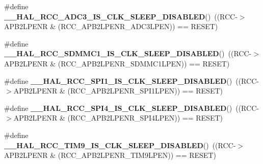 \begin{DoxyCompactItemize}
\item 
\mbox{\label{group___r_c_c___clock___sleep___enable___disable___status_ga443125428852ea38a7e59eabd07b9b6b}} 
\#define {\bfseries \+\_\+\+\_\+\+H\+A\+L\+\_\+\+R\+C\+C\+\_\+\+A\+D\+C3\+\_\+\+I\+S\+\_\+\+C\+L\+K\+\_\+\+S\+L\+E\+E\+P\+\_\+\+D\+I\+S\+A\+B\+L\+ED}()~((R\+CC-\/$>$A\+P\+B2\+L\+P\+E\+NR \& (R\+C\+C\+\_\+\+A\+P\+B2\+L\+P\+E\+N\+R\+\_\+\+A\+D\+C3\+L\+P\+EN)) == R\+E\+S\+ET)
\item 
\mbox{\label{group___r_c_c___clock___sleep___enable___disable___status_ga8b41f06ce1b40fd1e0481be7e364e6f6}} 
\#define {\bfseries \+\_\+\+\_\+\+H\+A\+L\+\_\+\+R\+C\+C\+\_\+\+S\+D\+M\+M\+C1\+\_\+\+I\+S\+\_\+\+C\+L\+K\+\_\+\+S\+L\+E\+E\+P\+\_\+\+D\+I\+S\+A\+B\+L\+ED}()~((R\+CC-\/$>$A\+P\+B2\+L\+P\+E\+NR \& (R\+C\+C\+\_\+\+A\+P\+B2\+L\+P\+E\+N\+R\+\_\+\+S\+D\+M\+M\+C1\+L\+P\+EN)) == R\+E\+S\+ET)
\item 
\mbox{\label{group___r_c_c___clock___sleep___enable___disable___status_gab9a82b96c7950398956ee6f58c3d5dda}} 
\#define {\bfseries \+\_\+\+\_\+\+H\+A\+L\+\_\+\+R\+C\+C\+\_\+\+S\+P\+I1\+\_\+\+I\+S\+\_\+\+C\+L\+K\+\_\+\+S\+L\+E\+E\+P\+\_\+\+D\+I\+S\+A\+B\+L\+ED}()~((R\+CC-\/$>$A\+P\+B2\+L\+P\+E\+NR \& (R\+C\+C\+\_\+\+A\+P\+B2\+L\+P\+E\+N\+R\+\_\+\+S\+P\+I1\+L\+P\+EN)) == R\+E\+S\+ET)
\item 
\mbox{\label{group___r_c_c___clock___sleep___enable___disable___status_gafaac663897775c9d6c6ed2f8dadafcf8}} 
\#define {\bfseries \+\_\+\+\_\+\+H\+A\+L\+\_\+\+R\+C\+C\+\_\+\+S\+P\+I4\+\_\+\+I\+S\+\_\+\+C\+L\+K\+\_\+\+S\+L\+E\+E\+P\+\_\+\+D\+I\+S\+A\+B\+L\+ED}()~((R\+CC-\/$>$A\+P\+B2\+L\+P\+E\+NR \& (R\+C\+C\+\_\+\+A\+P\+B2\+L\+P\+E\+N\+R\+\_\+\+S\+P\+I4\+L\+P\+EN)) == R\+E\+S\+ET)
\item 
\mbox{\label{group___r_c_c___clock___sleep___enable___disable___status_ga8b043bd22bd1c6aa4617d37e5565f8c6}} 
\#define {\bfseries \+\_\+\+\_\+\+H\+A\+L\+\_\+\+R\+C\+C\+\_\+\+T\+I\+M9\+\_\+\+I\+S\+\_\+\+C\+L\+K\+\_\+\+S\+L\+E\+E\+P\+\_\+\+D\+I\+S\+A\+B\+L\+ED}()~((R\+CC-\/$>$A\+P\+B2\+L\+P\+E\+NR \& (R\+C\+C\+\_\+\+A\+P\+B2\+L\+P\+E\+N\+R\+\_\+\+T\+I\+M9\+L\+P\+EN)) == R\+E\+S\+ET)

\end{DoxyCompactItemize}
